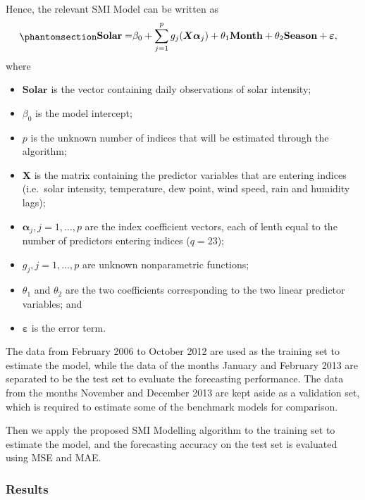 \documentclass[
  11pt,
  a4paper,
]{article}
\providecommand{\tightlist}{%
  \setlength{\itemsep}{0pt}\setlength{\parskip}{0pt}}\usepackage{longtable,booktabs,array}
\begin{document}
Hence, the relevant SMI Model can be written as
\begin{equation}\phantomsection\label{eq-solar}{
\begin{aligned}
  \textbf{Solar} = & \beta_{0} + \sum_{j = 1}^{p}{g_{j}(\bm{X}\bm{\alpha}_{j})} + \theta_{1}\textbf{Month} + \theta_{2}\textbf{Season}+ \bm{\varepsilon},
\end{aligned}
}\end{equation} where

\begin{itemize}
\tightlist
\item
  \(\textbf{Solar}\) is the vector containing daily observations of
  solar intensity;
\item
  \(\beta_{0}\) is the model intercept;
\item
  \(p\) is the unknown number of indices that will be estimated through
  the algorithm;
\item
  \(\bm{X}\) is the matrix containing the predictor variables that are
  entering indices (i.e.~solar intensity, temperature, dew point, wind
  speed, rain and humidity lags);
\item
  \(\bm{\alpha}_{j}, j = 1, \dots, p\) are the index coefficient
  vectors, each of lenth equal to the number of predictors entering
  indices (\(q= 23\));
\item
  \(g_{j}, j = 1, \dots, p\) are unknown nonparametric functions;
\item
  \(\theta_{1}\) and \(\theta_{2}\) are the two coefficients
  corresponding to the two linear predictor variables; and
\item
  \(\bm{\varepsilon}\) is the error term.
\end{itemize}

The data from February 2006 to October 2012 are used as the training set
to estimate the model, while the data of the months January and February
2013 are separated to be the test set to evaluate the forecasting
performance. The data from the months November and December 2013 are
kept aside as a validation set, which is required to estimate some of
the benchmark models for comparison.

Then we apply the proposed SMI Modelling algorithm to the training set
to estimate the model, and the forecasting accuracy on the test set is
evaluated using MSE and MAE.

\subsubsection{Results}\label{results-1}
\end{document}
